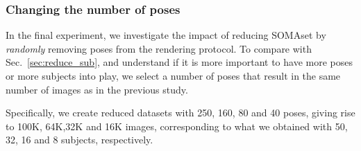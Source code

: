 \documentclass[10pt,journal,letterpaper,compsoc]{IEEEtran}
\begin{document}
\subsubsection{Changing the number of poses}\label{sec:reduce_pos}

In the final experiment, we investigate the impact of reducing SOMAset by \emph{randomly} removing poses from the rendering protocol. To compare with Sec.~\ref{sec:reduce_sub}, and understand if it is more important to have more poses or more subjects into play, we select a number of poses that result in the same number of images as in the previous study.


 Specifically, we create reduced datasets with 250, 160, 80 and 40 poses, giving rise to 100K, 64K,32K and 16K images, corresponding to what we obtained with 50, 32, 16 and 8 subjects, respectively.

\begin{table}[!htbp]
\scriptsize
	\centering
	\caption{Analysis of the role of the \emph{size} of SOMAset as training data. Here SOMAset was rendered in original and reduced versions by \emph{changing the number of poses}. The different versions of SOMAset were fine-tuned with the training partition of Market-1501, and tested on the test partition of the same dataset.}
\end{table}
\end{document}
